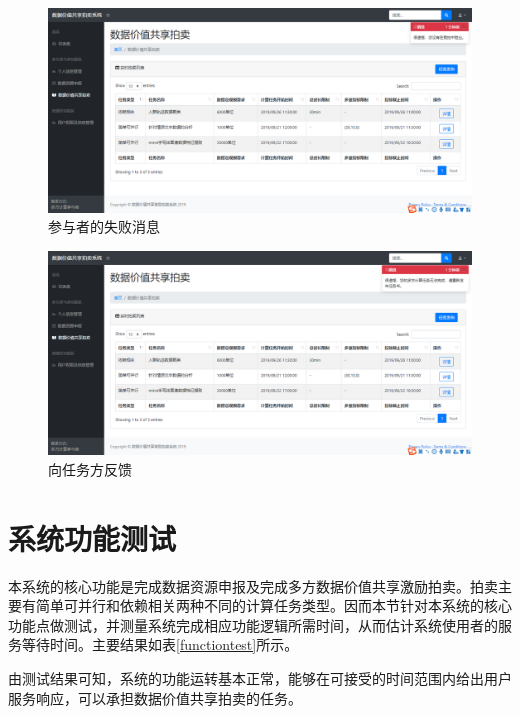 \documentclass[promaster]{thesis-uestc}
\begin{document}
\begin{figure}[H]
    \includegraphics[width=400pt]{ui/xinzengshibai.png}
    \caption{参与者的失败消息}
    \label{xinzengshibai}
\end{figure}

\begin{figure}[H]
    \includegraphics[width=400pt]{ui/xinzengrenwushibai.png}
    \caption{向任务方反馈}
    \label{xinzengrenwushibai}
\end{figure}

\FloatBarrier

\section{系统功能测试}
本系统的核心功能是完成数据资源申报及完成多方数据价值共享激励拍卖。拍卖主要有简单可并行和依赖相关两种不同的计算任务类型。因而本节针对本系统的核心功能点做测试，并测量系统完成相应功能逻辑所需时间，从而估计系统使用者的服务等待时间。主要结果如表\ref{functiontest}所示。

由测试结果可知，系统的功能运转基本正常，能够在可接受的时间范围内给出用户服务响应，可以承担数据价值共享拍卖的任务。
\end{document}
